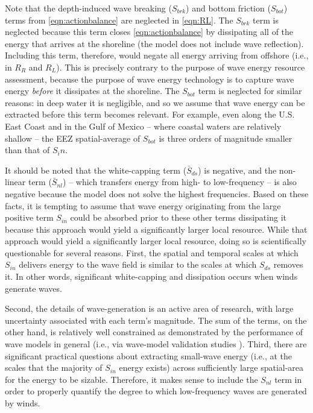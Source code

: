 Note that the depth-induced wave breaking ($S_{brk}$) and bottom friction ($S_{bot}$) terms from \eqref{eqn:actionbalance} are neglected in \eqref{eqn:RL}.
The $S_{brk}$ term is neglected because this term closes \eqref{eqn:actionbalance} by dissipating all of the energy that arrives at the shoreline (the model does not include wave reflection). Including this term, therefore, would negate all energy arriving from offshore (i.e., in $R_R$ and $R_L$). This is precisely contrary to the purpose of wave energy resource assessment, because the purpose of wave energy technology is to capture wave energy {\it before} it dissipates at the shoreline. The $S_{bot}$ term is neglected for similar reasons: in deep water it is negligible, and so we assume that wave energy can be extracted before this term becomes relevant. For example, even along the U.S. East Coast and in the Gulf of Mexico -- where coastal waters are relatively shallow -- the EEZ spatial-average of $S_{bot}$ is three orders of magnitude smaller than that of $S_in$.

It should be noted that the white-capping term ($\bar{S}_{ds}$) is negative, and the non-linear term ($\bar{S}_{nl}$) -- which transfers energy from high- to low-frequency -- is also negative because the model does not solve the highest frequencies.
Based on these facts, it is tempting to assume that wave energy originating from the large positive term $S_{in}$ could be absorbed prior to these other terms dissipating it because this approach would yield a significantly larger local resource. While that approach would yield a significantly larger local resource, doing so is scientifically questionable for several reasons. First, the spatial and temporal scales at which $S_{in}$ delivers energy to the wave field is similar to the scales at which $S_{ds}$ removes it. In other words, significant white-capping and dissipation occurs when winds generate waves.

Second, the details of wave-generation is an active area of research, with large uncertainty associated with each term's magnitude. The sum of the terms, on the other hand, is relatively well constrained as demonstrated by the performance of wave models in general (i.e., via wave-model validation studies \citep[e.g.][]{ardhuin_semiempirical_2010,van_vledder_source_2016}). Third, there are significant practical questions about extracting small-wave energy (i.e., at the scales that the majority of $S_{in}$ energy exists) across sufficiently large spatial-area for the energy to be sizable. Therefore, it makes sense to include the $S_{nl}$ term in order to properly quantify the degree to which low-frequency waves are generated by winds.

